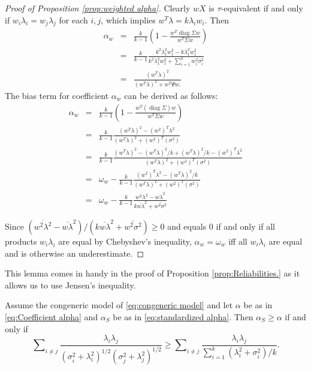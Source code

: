 \documentclass[twoside]{article}
\DeclareMathOperator{\diag}{diag}
\DeclareMathOperator{\tsum}{\textstyle \sum}
\renewcommand{\sqrt}[1]{{(#1)^{1/2}}}
\begin{document}
\begin{proof}[Proof of Proposition \ref{prop:weighted alpha}]
\label{proof:weighted alpha}Clearly $wX$ is $\tau$-equivalent
if and only if $w_{i}\lambda_{i}=w_{j}\lambda_{j}$ for each $i,j$,
which implies $w^{T}\lambda=k\lambda_{i}w_{i}$. Then
\begin{eqnarray*}
\alpha_{w} & = & \frac{k}{k-1}\left(1-\frac{w^{T}\diag\Sigma w}{w^{T}\Sigma w}\right)\\
 & = & \frac{k}{k-1}\frac{k^{2}\lambda_{1}^{2}w_{1}^{2}-k\lambda_{1}^{2}w_{1}^{2}}{k^{2}\lambda_{1}^{2}w_{1}^{2}+\tsum_{i=1}^{k}w_{i}^{2}\sigma_{i}^{2}}\\
 & = & \frac{(w^{T}\lambda)^{2}}{(w^{T}\lambda)^{2}+w^{T}\Psi w.}
\end{eqnarray*}
The bias term for coefficient $\alpha_w$ can be derived as follows:
\begin{eqnarray*}
\alpha_{w} & = & \frac{k}{k-1}(1-\frac{w^{T}(\diag\Sigma)w}{w^{T}\Sigma w})\\
 & = & \frac{k}{k-1}\frac{(w^{T}\lambda)^{2}-(w^{2})^{T}\lambda^{2}}{(w^{T}\lambda)^{2}+(w^{2})^{T}(\sigma^{2})}\\
 & = & \frac{k}{k-1}\frac{(w^{T}\lambda)^{2}-(w^{T}\lambda)^{2}/k+(w^{T}\lambda)^{2}/k-(w^{2})^{T}\lambda^{2}}{(w^{T}\lambda)^{2}+(w^{2})^{T}(\sigma^{2})}\\
 & = & \omega_{w}-\frac{k}{k-1}\frac{(w^{2})^{T}\lambda^{2}-(w^{T}\lambda)^{2}/k}{(w^{T}\lambda)^{2}+(w^{2})^{T}(\sigma^{2})}\\
 & = & \omega_{w}-\frac{k}{k-1}\frac{\overline{w^{2}\lambda^{2}}-\overline{w\lambda}^{2}}{k\overline{w\lambda}^{2}+\overline{w^{2}\sigma^{2}}}
\end{eqnarray*}

Since $(\overline{w^{2}\lambda^{2}}-\overline{w\lambda}^{2})/(k\overline{w\lambda}^{2}+\overline{w^{2}\sigma^{2}})\geq0$
and equals $0$ if and only if all products $w_i\lambda_i$ are equal by Chebyshev's inequality, $\alpha_w=\omega_w$
iff all $w_i\lambda_i$ are equal and is otherwise an underestimate. 


\end{proof}


This lemma comes in handy in the proof of Proposition \ref{prop:Reliabilities.} as it allows us to use Jensen's inequality.

\begin{lem}
\label{lem:alpha_s}
Assume the congeneric model of \eqref{eq:congeneric model} and let $\alpha$ be as in \eqref{eq:Coefficient alpha} and $\alpha_S$ be as in \eqref{eq:standardized alpha}. Then $\alpha_S\geq\alpha$
if and only if
\begin{equation}
\label{eq:Alpha-alpha_s inequality}
\tsum_{i\neq j}\frac{\lambda_{i}\lambda_{j}}{\sqrt{\sigma_{i}^{2}+\lambda_{i}^{2}}\sqrt{\sigma_j^{2}+\lambda_{j}^{2}}} 
\geq
\tsum_{i\neq j}\frac{\lambda_{i}\lambda_{j}}{\tsum_{i=1}^{k}(\lambda_{i}^{2}+\sigma_{i}^{2})/k}.
\end{equation}
\end{lem}
\end{document}

